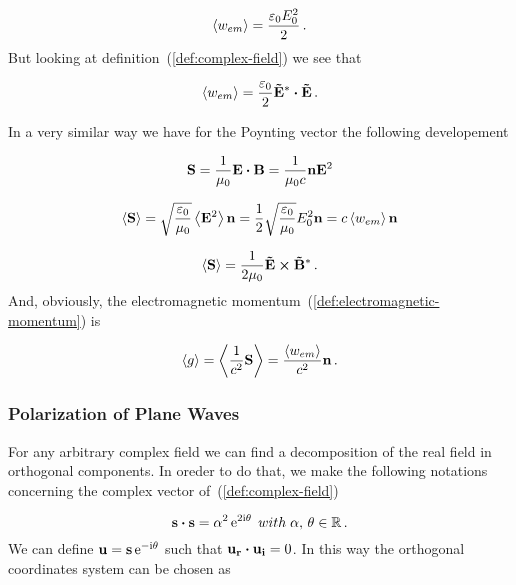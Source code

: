 \documentclass[12pt, class=report, crop=false]{standalone}
\begin{document}
\begin{equation}
  \expval{w_{em}} = \frac{\varepsilon_0 E_0^2}{2} \,.
\end{equation}
But looking at definition~(\ref{def:complex-field}) we see that

\begin{equation}
  \expval{w_{em}} = \frac{\varepsilon_0}{2} \vb{\tilde{E}^*} \vdot \vb{\tilde{E}} \,.
\end{equation}

\par
In a very similar way we have for the Poynting vector the following developement

\begin{equation}
  \vb{S} = \frac{1}{\mu_0} \vb{E}\vdot\vb{B} = \frac{1}{\mu_0 c} \vb{n} \vb{E}^2
\end{equation}

\begin{equation}
  \label{def:poynting-plane-wave}
  \expval{\vb{S}} = \sqrt{\frac{\varepsilon_0}{\mu_0}} \expval{\vb{E}^2} \vb{n} = \frac{1}{2} \sqrt{\frac{\varepsilon_0}{\mu_0}} E_0^2 \vb{n} = c \expval{w_{em}} \vb{n}
\end{equation}

\begin{equation}
\expval{\vb{S}} = \frac{1}{2\mu_0} \vb{\tilde{E}}\cp \vb{\tilde{B}^*} \,.
\end{equation}
And, obviously, the electromagnetic momentum~(\ref{def:electromagnetic-momentum}) is

\begin{equation}
  \expval{g} = \expval{\frac{1}{c^2} \vb{S}} = \frac{\expval{w_{em}}}{c^2} \vb{n} \,.
\end{equation}

\subsubsection{Polarization of Plane Waves}

For any arbitrary complex field we can find a decomposition of the real field in orthogonal components. In oreder to do that, we make the following notations concerning the complex vector of~(\ref{def:complex-field})

\begin{equation}
  \vb{s}\vdot\vb{s} = \alpha^2 \ee^{2 \ii \theta} \; with \; \alpha , \, \theta \in \mathbb{R} \,.
\end{equation}
We can define \(\vb{u} = \vb{s} \operatorname{e}^{-\mathrm{i} \theta}\) such that \(\vb{u_r}\vdot\vb{u_i}=0\). In this way the orthogonal coordinates system can be chosen as
\end{document}
